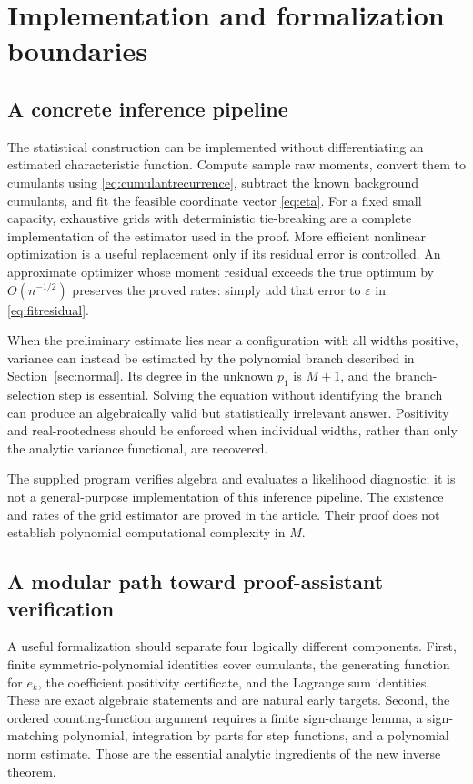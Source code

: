 \documentclass[11pt,a4paper]{article}
\numberwithin{equation}{section}
\theoremstyle{definition}
\theoremstyle{remark}
\begin{document}
\section{Implementation and formalization boundaries}
\label{sec:implementation}

\subsection{A concrete inference pipeline}
The statistical construction can be implemented without differentiating an
estimated characteristic function. Compute sample raw moments, convert them
to cumulants using \eqref{eq:cumulantrecurrence}, subtract the known background
cumulants, and fit the feasible coordinate vector \eqref{eq:eta}. For a fixed
small capacity, exhaustive grids with deterministic tie-breaking are a complete
implementation of the estimator used in the proof. More efficient nonlinear
optimization is a useful replacement only if its residual error is controlled.
An approximate optimizer whose moment residual exceeds the true optimum by
$O(n^{-1/2})$ preserves the proved rates: simply add that error to
$\varepsilon$ in \eqref{eq:fitresidual}.

When the preliminary estimate lies near a configuration with all widths
positive, variance can instead be estimated by the polynomial branch described
in Section~\ref{sec:normal}. Its degree in the unknown $p_1$ is $M+1$, and the
branch-selection step is essential. Solving the equation without identifying
the branch can produce an algebraically valid but statistically irrelevant
answer. Positivity and real-rootedness should be enforced when individual
widths, rather than only the analytic variance functional, are recovered.

The supplied program verifies algebra and evaluates a likelihood diagnostic;
it is not a general-purpose implementation of this inference pipeline. The
existence and rates of the grid estimator are proved in the article. Their
proof does not establish polynomial computational complexity in $M$.

\subsection{A modular path toward proof-assistant verification}
A useful formalization should separate four logically different components.
First, finite symmetric-polynomial identities cover cumulants, the generating
function for $e_k$, the coefficient positivity certificate, and the Lagrange
sum identities. These are exact algebraic statements and are natural early
targets. Second, the ordered counting-function argument requires a finite
sign-change lemma, a sign-matching polynomial, integration by parts for step
functions, and a polynomial norm estimate. Those are the essential analytic
ingredients of the new inverse theorem.
\end{document}
